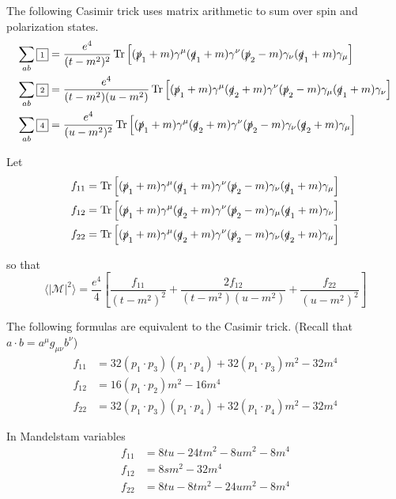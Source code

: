 The following Casimir trick uses matrix arithmetic to sum over spin and polarization states.
\begin{align*}
\sum_{ab}{\boxed{\scriptstyle1}}&=\frac{e^4}{(t-m^2)^2}\operatorname{Tr}
\left[
(\slashed p_1+m)\gamma^\mu(\slashed q_1+m)\gamma^\nu(\slashed p_2-m)\gamma_\nu(\slashed q_1+m)\gamma_\mu
\right]
\\
\sum_{ab}{\boxed{\scriptstyle2}}&=\frac{e^4}{(t-m^2)(u-m^2)}\operatorname{Tr}
\left[
(\slashed p_1+m)\gamma^\mu(\slashed q_2+m)\gamma^\nu(\slashed p_2-m)\gamma_\mu(\slashed q_1+m)\gamma_\nu
\right]
\\
\sum_{ab}{\boxed{\scriptstyle4}}&=\frac{e^4}{(u-m^2)^2}\operatorname{Tr}
\left[
(\slashed p_1+m)\gamma^\mu(\slashed q_2+m)\gamma^\nu(\slashed p_2-m)\gamma_\nu(\slashed q_2+m)\gamma_\mu
\right]
\end{align*}

Let
\begin{align*}
f_{11}&=\operatorname{Tr}
\left[
(\slashed p_1+m)\gamma^\mu(\slashed q_1+m)\gamma^\nu(\slashed p_2-m)\gamma_\nu(\slashed q_1+m)\gamma_\mu
\right]
\\
f_{12}&=\operatorname{Tr}
\left[
(\slashed p_1+m)\gamma^\mu(\slashed q_2+m)\gamma^\nu(\slashed p_2-m)\gamma_\mu(\slashed q_1+m)\gamma_\nu
\right]
\\
f_{22}&=\operatorname{Tr}
\left[
(\slashed p_1+m)\gamma^\mu(\slashed q_2+m)\gamma^\nu(\slashed p_2-m)\gamma_\nu(\slashed q_2+m)\gamma_\mu
\right]
\end{align*}

so that
\begin{equation*}
\langle|\mathcal{M}|^2\rangle=\frac{e^4}{4}
\left[
\frac{f_{11}}{(t-m^2)^2}+\frac{2f_{12}}{(t-m^2)(u-m^2)}+\frac{f_{22}}{(u-m^2)^2}
\right]
\end{equation*}

The following formulas are equivalent to the Casimir trick.
(Recall that $a\cdot b=a^\mu g_{\mu\nu}b^\nu$)
\begin{align*}
f_{11}&=32 (p_1\cdot p_3) (p_1\cdot p_4) + 32 (p_1\cdot p_3) m^2 - 32 m^4
\\
f_{12}&=16 (p_1\cdot p_2) m^2 - 16 m^4
\\
f_{22}&=32 (p_1\cdot p_3) (p_1\cdot p_4) + 32 (p_1\cdot p_4) m^2 - 32 m^4
\end{align*}

In Mandelstam variables
\begin{align*}
f_{11}&=8 t u - 24 t m^2 - 8 u m^2 - 8 m^4
\\
f_{12}&=8 s m^2 - 32 m^4
\\
f_{22}&=8 t u - 8 t m^2 - 24 u m^2 - 8 m^4
\end{align*}

